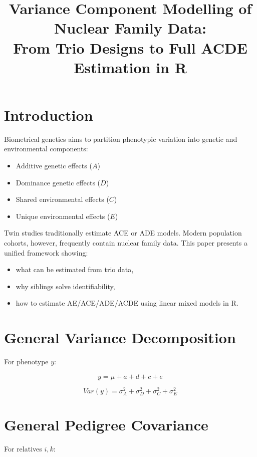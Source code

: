 \documentclass[12pt]{article}
\title{Variance Component Modelling of Nuclear Family Data:\\
From Trio Designs to Full ACDE Estimation in R}
\author{}
\date{}
\begin{document}
\maketitle
\tableofcontents

\section{Introduction}

Biometrical genetics aims to partition phenotypic variation into
genetic and environmental components:

\begin{itemize}
\item Additive genetic effects ($A$)
\item Dominance genetic effects ($D$)
\item Shared environmental effects ($C$)
\item Unique environmental effects ($E$)
\end{itemize}

Twin studies traditionally estimate ACE or ADE models.  
Modern population cohorts, however, frequently contain nuclear family
data. This paper presents a unified framework showing:

\begin{itemize}
\item what can be estimated from trio data,
\item why siblings solve identifiability,
\item how to estimate AE/ACE/ADE/ACDE using linear mixed models in R.
\end{itemize}

\section{General Variance Decomposition}

For phenotype $y$:

\[
y = \mu + a + d + c + e
\]

\[
Var(y) = \sigma_A^2 + \sigma_D^2 + \sigma_C^2 + \sigma_E^2
\]

\section{General Pedigree Covariance}

For relatives $i,k$:
\end{document}
